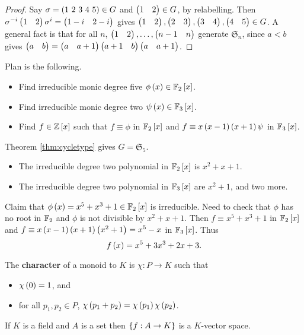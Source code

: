 \begin{proof}
Say $ \sigma = \left( 1 \ 2 \ 3 \ 4 \ 5 \right) \in G $ and $ \begin{pmatrix} 1 & 2 \end{pmatrix} \in G $, by relabelling. Then $ \sigma^{-i}\begin{pmatrix} 1 & 2 \end{pmatrix}\sigma^i = \begin{pmatrix} 1 - i & 2 - i \end{pmatrix} $ gives $ \begin{pmatrix} 1 & 2 \end{pmatrix}, \begin{pmatrix} 2 & 3 \end{pmatrix}, \begin{pmatrix} 3 & 4 \end{pmatrix}, \begin{pmatrix} 4 & 5 \end{pmatrix} \in G $. A general fact is that for all $ n $, $ \begin{pmatrix} 1 & 2 \end{pmatrix}, \dots, \begin{pmatrix} n - 1 & n \end{pmatrix} $ generate $ \mathfrak{S}_n $, since $ a < b $ gives $ \begin{pmatrix} a & b \end{pmatrix} = \begin{pmatrix} a & a + 1 \end{pmatrix}\begin{pmatrix} a + 1 & b \end{pmatrix}\begin{pmatrix} a & a + 1 \end{pmatrix} $.
\end{proof}

Plan is the following.
\begin{itemize}
\item Find irreducible monic degree five $ \phi\left( x \right) \in \mathbb{F}_2\left[ x \right] $.
\item Find irreducible monic degree two $ \psi\left( x \right) \in \mathbb{F}_3\left[ x \right] $.
\item Find $ f \in \mathbb{Z}\left[ x \right] $ such that $ f \equiv \phi $ in $ \mathbb{F}_2\left[ x \right] $ and $ f \equiv x\left( x - 1 \right)\left( x + 1 \right)\psi $ in $ \mathbb{F}_3\left[ x \right] $.
\end{itemize}
Theorem \ref{thm:cycletype} gives $ G = \mathfrak{S}_5 $.
\begin{itemize}
\item The irreducible degree two polynomial in $ \mathbb{F}_2\left[ x \right] $ is $ x^2 + x + 1 $.
\item The irreducible degree two polynomial in $ \mathbb{F}_3\left[ x \right] $ are $ x^2 + 1 $, and two more.
\end{itemize}
Claim that $ \phi\left( x \right) = x^5 + x^3 + 1 \in \mathbb{F}_2\left[ x \right] $ is irreducible. Need to check that $ \phi $ has no root in $ \mathbb{F}_2 $ and $ \phi $ is not divisible by $ x^2 + x + 1 $. Then $ f \equiv x^5 + x^3 + 1 $ in $ \mathbb{F}_2\left[ x \right] $ and $ f \equiv x\left( x - 1 \right)\left( x + 1 \right)\left( x^2 + 1 \right) = x^5 - x $ in $ \mathbb{F}_3\left[ x \right] $. Thus
$$ f\left( x \right) = x^5 + 3x^3 + 2x + 3. $$


\begin{definition}
The \textbf{character} of a monoid to $ K $ is $ \chi : P \to K $ such that
\begin{itemize}
\item $ \chi\left( 0 \right) = 1 $, and
\item for all $ p_1, p_2 \in P $, $ \chi\left( p_1 + p_2 \right) = \chi\left( p_1 \right)\chi\left( p_2 \right) $.
\end{itemize}
\end{definition}

\begin{remark*}
If $ K $ is a field and $ A $ is a set then $ \left\{ f : A \to K \right\} $ is a $ K $-vector space.
\end{remark*}

